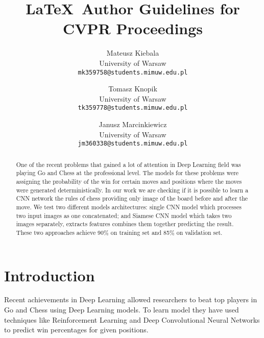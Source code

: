\documentclass[10pt,twocolumn,letterpaper]{article}
\begin{document}
\title{\LaTeX\ Author Guidelines for CVPR Proceedings}

\author{Mateusz Kiebala\\
University of Warsaw\\
{\tt\small mk359758@students.mimuw.edu.pl}
\and
Tomasz Knopik\\
University of Warsaw\\
{\tt\small tk359778@students.mimuw.edu.pl}
\and
Janusz Marcinkiewicz\\
University of Warsaw\\
{\tt\small jm360338@students.mimuw.edu.pl}}

\maketitle

\begin{abstract}
   One of the recent problems that gained a lot of attention in Deep Learning
   field was playing Go and Chess at the professional level. The models for these
   problems were assigning the probability of the win for certain moves and
   positions where the moves were generated deterministically. In our work we are
   checking if it is possible to learn a CNN network the rules of chess
   providing only image of the board before and after the move. We test two
   different models architectures: single CNN model which processes two input
   images as one concatenated; and Siamese CNN model which takes two images
   separately, extracts features combines them together predicting the result.
   These two approaches achieve 90\% on training set and 85\% on validation set.
\end{abstract}

\section{Introduction}

Recent achievements in Deep Learning allowed researchers to beat top players in
Go and Chess using Deep Learning models. To learn model they have used
techniques like Reinforcement Learning and Deep Convolutional Neural Networks to
predict win percentages for given positions.
\end{document}
